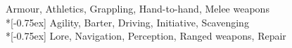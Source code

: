 
{\footnotesize
{} Armour, Athletics, Grappling, Hand-to-hand, Melee weapons \\*[-0.75ex]
 Agility, Barter, Driving, Initiative, Scavenging \\*[-0.75ex]
 Lore, Navigation, Perception, Ranged weapons, Repair}
